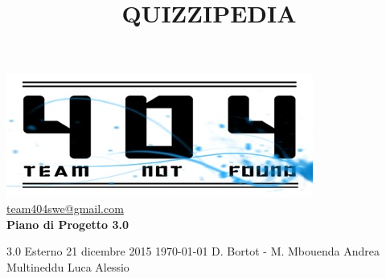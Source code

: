 \documentclass[a4paper,11pt]{article}
\title{\textbf{{\fontsize{10mm}{6mm}\selectfont QUIZZIPEDIA}}}
\begin{document}
	\maketitle
	
	\begin{center}

	\includegraphics{../../team_not_found.jpg}\\	
	\fontsize{5mm}{3mm}\url{team404swe@gmail.com}\\
	\vspace{40mm}
	\textbf{ Piano di Progetto 3.0}
	\end{center}
	\thispagestyle{empty}	%
			{3.0} 							%
			{Esterno} 						%
			{21 dicembre 2015} 				%
			{\today} 						%
			{D. Bortot - M. Mbouenda}		%
			{Andrea Multineddu} 			%
			{Luca Alessio} 				%
	
	\newpage
	\thispagestyle{empty}
	\null
	
	\newpage
	\fancyfoot[R]{\thepage}
\end{document}
